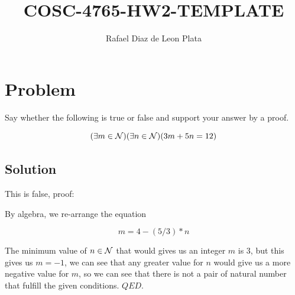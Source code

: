 \documentclass[letter]{article}
\title{COSC-4765-HW2-TEMPLATE}
\author{Rafael Diaz de Leon Plata}
\begin{document}
\section{Problem}
Say whether the following is true or false and support your answer by a proof.

$$
(\exists m \in {\cal N})(\exists n \in {\cal N})(3m + 5n = 12)
$$

\subsection{Solution}
This is false, proof:

By algebra, we re-arrange the equation

$$
m = 4 - (5/3)*n
$$

The minimum value of $ n \in {\cal N} $ that would gives us an integer $m$ is 3,
but this gives us $ m = - 1 $, we can see that any greater value for $n$ would
give us a more negative value for $m$, so we can see that there is not a pair
of natural number that fulfill the given conditions. $QED$.
\end{document}
